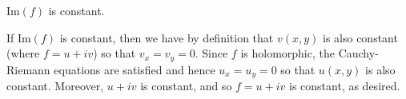 $\text{Im}(f)$ is constant.

\begin{solution}
    If $\text{Im}(f)$ is constant, then we have by definition that $v(x, y)$ is also constant (where $f = u + iv$) so 
    that $v_x = v_y = 0$. Since $f$ is holomorphic, the Cauchy-Riemann equations are satisfied and hence 
    $u_x = u_y = 0$ so that $u(x, y)$ is also constant. Moreover, $u + i v$ is constant, and so $f = u + iv$ is 
    constant, as desired.
    \ \\
\end{solution}
